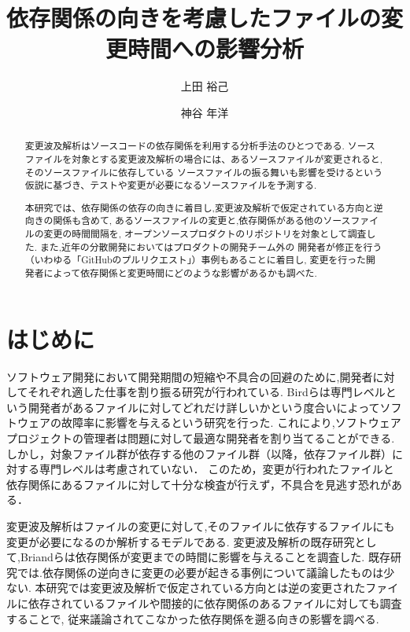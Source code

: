 \documentclass{fose2016}           %
\title{依存関係の向きを考慮したファイルの変更時間への影響分析}
\author{上田 裕己}{Ueda Yuki, 島根大学}
\author{神谷 年洋}{Kamiya Toshihiro, 島根大学}
\begin{document}
\maketitle

\begin{abstract}
変更波及解析はソースコードの依存関係を利用する分析手法のひとつである.
ソースファイルを対象とする変更波及解析の場合には、あるソースファイルが変更されると,そのソースファイルに依存している
ソースファイルの振る舞いも影響を受けるという仮説に基づき、テストや変更が必要になるソースファイルを予測する.

本研究では、依存関係の依存の向きに着目し,変更波及解析で仮定されている方向と逆向きの関係も含めて,
あるソースファイルの変更と,依存関係がある他のソースファイルの変更の時間間隔を,
オープンソースプロダクトのリポジトリを対象として調査した.
また,近年の分散開発においてはプロダクトの開発チーム外の
開発者が修正を行う（いわゆる「GitHubのプルリクエスト」）事例もあることに着目し,
変更を行った開発者によって依存関係と変更時間にどのような影響があるかも調べた.

\end{abstract}



\section{はじめに} 
ソフトウェア開発において開発期間の短縮や不具合の回避のために,開発者に対してそれぞれ適した仕事を割り振る研究が行われている\cite{Bird,Patanamon}.
Bird\cite{Bird}らは専門レベルという開発者があるファイルに対してどれだけ詳しいかという度合いによってソフトウェアの故障率に影響を与えるという研究を行った.
これにより,ソフトウェアプロジェクトの管理者は問題に対して最適な開発者を割り当てることができる.
しかし，対象ファイル群が依存する他のファイル群（以降，依存ファイル群）に対する専門レベルは考慮されていない．
このため，変更が行われたファイルと依存関係にあるファイルに対して十分な検査が行えず，不具合を見逃す恐れがある．

変更波及解析はファイルの変更に対して,そのファイルに依存するファイルにも変更が必要になるのか解析するモデルである.
変更波及解析の既存研究として,Briand\cite{Briand}らは依存関係が変更までの時間に影響を与えることを調査した.
既存研究では.依存関係の逆向きに変更の必要が起きる事例について議論したものは少ない\cite{Omori}.
本研究では変更波及解析で仮定されている方向とは逆の変更されたファイルに依存されているファイルや間接的に依存関係のあるファイルに対しても調査することで,
従来議論されてこなかった依存関係を遡る向きの影響を調べる.
\end{document}

